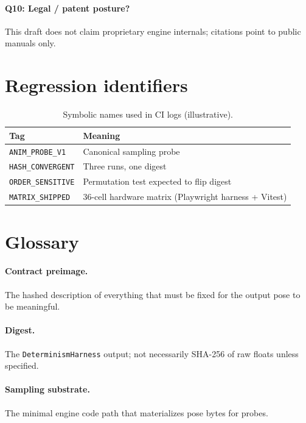 \documentclass[sigconf,nonacm]{acmart}
\begin{document}
\paragraph{Q10: Legal / patent posture?}
This draft does not claim proprietary engine internals; citations point to
public manuals only.

\section{Regression identifiers}
\label{app:reg}

\begin{table}[t]
  \centering
  \caption{Symbolic names used in CI logs (illustrative).}
  \label{tab:reg}
  \footnotesize
  \begin{tabular}{@{}ll@{}}
    \toprule
    \textbf{Tag} & \textbf{Meaning} \\
    \midrule
    \texttt{ANIM\_PROBE\_V1} & Canonical sampling probe \\
    \texttt{HASH\_CONVERGENT} & Three runs, one digest \\
    \texttt{ORDER\_SENSITIVE} & Permutation test expected to flip digest \\
    \texttt{MATRIX\_SHIPPED} & 36-cell hardware matrix (Playwright harness + Vitest) \\
    \bottomrule
  \end{tabular}
\end{table}

\section{Glossary}
\label{app:gloss}

\paragraph{Contract preimage.}
The hashed description of everything that must be fixed for the output pose
to be meaningful.

\paragraph{Digest.}
The \texttt{DeterminismHarness} output; not necessarily SHA-256 of raw floats
unless specified.

\paragraph{Sampling substrate.}
The minimal engine code path that materializes pose bytes for probes.
\end{document}
